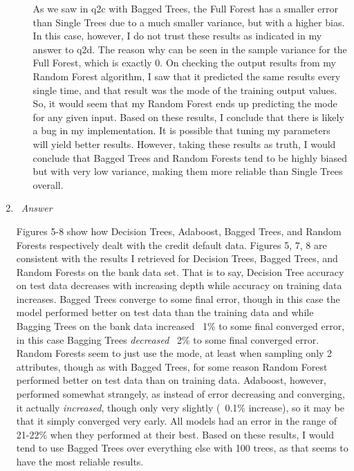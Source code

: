 \documentclass[12pt, fullpage,letterpaper]{article}
\begin{document}
\begin{enumerate}
\begin{enumerate}
    As we saw in q2c with Bagged Trees, the Full Forest has a smaller error than Single Trees due to a much smaller variance, but with a higher bias. In this case, however, I do not trust these results as indicated in my answer to q2d. The reason why can be seen in the sample variance for the Full Forest, which is exactly 0. On checking the output results from my Random Forest algorithm, I saw that it predicted the same results every single time, and that result was the mode of the training output values. So, it would seem that my Random Forest ends up predicting the mode for any given input. Based on these results, I conclude that there is likely a bug in my implementation. It is possible that tuning my parameters will yield better results. However, taking these results as truth, I would conclude that Bagged Trees and Random Forests tend to be highly biased but with very low variance, making them more reliable than Single Trees overall.
    
	
\end{enumerate}

\item~\emph{Answer}

Figures 5-8 show how Decision Trees, Adaboost, Bagged Trees, and Random Forests respectively dealt with the credit default data. Figures 5, 7, 8 are consistent with the results I retrieved for Decision Trees, Bagged Trees, and Random Forests on the bank data set. That is to say, Decision Tree accuracy on test data decreases with increasing depth while accuracy on training data increases. Bagged Trees converge to some final error, though in this case the model performed better on test data than the training data and while Bagging Trees on the bank data increased ~1\% to some final converged error, in this case Bagging Trees \emph{decreased} ~2\% to some final converged error. Random Forests seem to just use the mode, at least when sampling only 2 attributes, though as with Bagged Trees, for some reason Random Forest performed better on test data than on training data. Adaboost, however, performed somewhat strangely, as instead of error decreasing and converging, it actually \emph{increased}, though only very slightly (~0.1\% increase), so it may be that it simply converged very early. All models had an error in the range of 21-22\% when they performed at their best. Based on these results, I would tend to use Bagged Trees over everything else with 100 trees, as that seems to have the most reliable results.


\end{enumerate}
\end{document}
